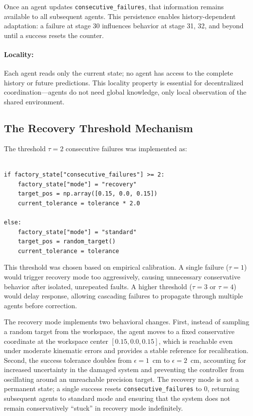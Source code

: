 \documentclass[12pt,a4paper,oneside]{report}
\begin{document}
Once an agent updates \texttt{consecutive\_failures}, that information remains available to all subsequent agents. This persistence enables history-dependent adaptation: a failure at stage 30 influences behavior at stage 31, 32, and beyond until a success resets the counter.
\paragraph{Locality:} Each agent reads only the current state; no agent has access to the complete history or future predictions. This locality property is essential for decentralized coordination---agents do not need global knowledge, only local observation of the shared environment.
\subsection{The Recovery Threshold Mechanism}
\label{subsec:the_recovery_threshold_mechanism}

The threshold $\tau = 2$ consecutive failures was implemented as:
\begin{verbatim}

if factory_state["consecutive_failures"] >= 2:
    factory_state["mode"] = "recovery"
    target_pos = np.array([0.15, 0.0, 0.15])
    current_tolerance = tolerance * 2.0

else:
    factory_state["mode"] = "standard"
    target_pos = random_target()
    current_tolerance = tolerance

\end{verbatim}

This threshold was chosen based on empirical calibration. A single failure ($\tau = 1$) would trigger recovery mode too aggressively, causing unnecessary conservative behavior after isolated, unrepeated faults. A higher threshold ($\tau = 3$ or $\tau = 4$) would delay response, allowing cascading failures to propagate through multiple agents before correction.

The recovery mode implements two behavioral changes. First, instead of sampling a random target from the workspace, the agent moves to a fixed conservative coordinate at the workspace center $[0.15, 0.0, 0.15]$, which is reachable even under moderate kinematic errors and provides a stable reference for recalibration. Second, the success tolerance doubles from $\epsilon = 1$~cm to $\epsilon = 2$~cm, accounting for increased uncertainty in the damaged system and preventing the controller from oscillating around an unreachable precision target. The recovery mode is not a permanent state; a single success resets \texttt{consecutive\_failures} to 0, returning subsequent agents to standard mode and ensuring that the system does not remain conservatively ``stuck'' in recovery mode indefinitely.
\end{document}
